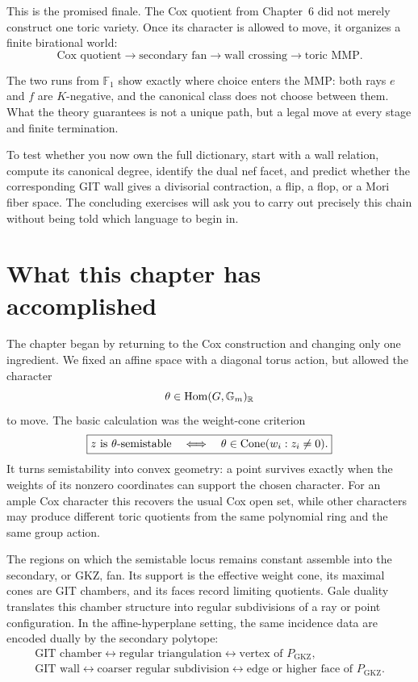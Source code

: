 This is the promised finale.  The Cox quotient from Chapter~6 did not
merely construct one toric variety.  Once its character is allowed to
move, it organizes a finite birational world:
\[
\boxed{
\text{Cox quotient}
\longrightarrow
\text{secondary fan}
\longrightarrow
\text{wall crossing}
\longrightarrow
\text{toric MMP}.}
\]

\begin{pauseandthink}
The two runs from \(\mathbb F_1\) show exactly where choice enters the
MMP: both rays \(e\) and \(f\) are \(K\)-negative, and the canonical
class does not choose between them.  What the theory guarantees is not
a unique path, but a legal move at every stage and finite termination.

To test whether you now own the full dictionary, start with a wall
relation, compute its canonical degree, identify the dual nef facet,
and predict whether the corresponding GIT wall gives a divisorial
contraction, a flip, a flop, or a Mori fiber space.  The concluding
exercises will ask you to carry out precisely this chain without being
told which language to begin in.
\end{pauseandthink}

\clearpage
\section*{What this chapter has accomplished}

The chapter began by returning to the Cox construction and changing
only one ingredient.  We fixed an affine space with a diagonal torus
action, but allowed the character
\[
\theta\in\operatorname{Hom}(G,\mathbb{G}_{m})_{\mathbb{R}}
\]
to move.  The basic calculation was the weight-cone criterion
\[
\boxed{
z\text{ is }\theta\text{-semistable}
\quad\Longleftrightarrow\quad
\theta\in
\operatorname{Cone}(w_i:z_i\neq0).}
\]
It turns semistability into convex geometry: a point survives exactly
when the weights of its nonzero coordinates can support the chosen
character.  For an ample Cox character this recovers the usual Cox
open set, while other characters may produce different toric
quotients from the same polynomial ring and the same group action.

The regions on which the semistable locus remains constant assemble
into the secondary, or GKZ, fan.  Its support is the effective weight
cone, its maximal cones are GIT chambers, and its faces record limiting
quotients.  Gale duality translates this chamber structure into
regular subdivisions of a ray or point configuration.  In the
affine-hyperplane setting, the same incidence data are encoded dually
by the secondary polytope:
\[
\boxed{
\begin{gathered}
\text{GIT chamber}
\longleftrightarrow
\text{regular triangulation}
\longleftrightarrow
\text{vertex of }P_{\mathrm{GKZ}},
\\
\text{GIT wall}
\longleftrightarrow
\text{coarser regular subdivision}
\longleftrightarrow
\text{edge or higher face of }P_{\mathrm{GKZ}}.
\end{gathered}}
\]

